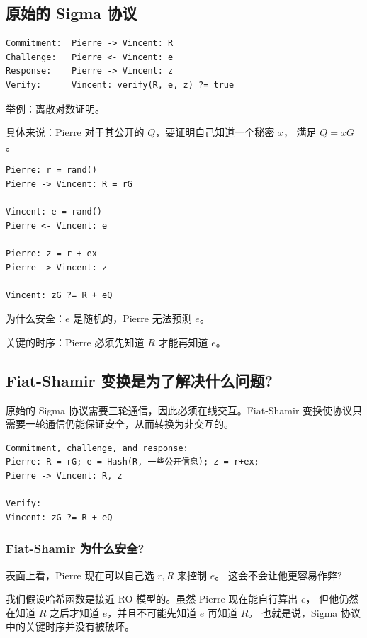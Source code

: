 

\subsection{原始的 Sigma 协议}

\begin{verbatim}
Commitment:  Pierre -> Vincent: R
Challenge:   Pierre <- Vincent: e
Response:    Pierre -> Vincent: z
Verify:      Vincent: verify(R, e, z) ?= true
\end{verbatim}

举例：离散对数证明。

具体来说：Pierre 对于其公开的 $Q$，要证明自己知道一个秘密 $x$，
满足 $Q=xG$。

\begin{verbatim}
Pierre: r = rand()
Pierre -> Vincent: R = rG

Vincent: e = rand()
Pierre <- Vincent: e

Pierre: z = r + ex
Pierre -> Vincent: z

Vincent: zG ?= R + eQ
\end{verbatim}

为什么安全：$e$ 是随机的，Pierre 无法预测 $e$。

关键的时序：Pierre 必须先知道 $R$ 才能再知道 $e$。

\subsection{Fiat-Shamir 变换是为了解决什么问题?}

原始的 Sigma 协议需要三轮通信，因此必须在线交互。Fiat-Shamir
变换使协议只需要一轮通信仍能保证安全，从而转换为非交互的。

\begin{verbatim}
Commitment, challenge, and response:
Pierre: R = rG; e = Hash(R, 一些公开信息); z = r+ex;
Pierre -> Vincent: R, z

Verify:
Vincent: zG ?= R + eQ
\end{verbatim}

\subsubsection{Fiat-Shamir 为什么安全?}

表面上看，Pierre 现在可以自己选 $r, R$ 来控制 $e$。
这会不会让他更容易作弊?

我们假设哈希函数是接近 RO 模型的。虽然 Pierre 现在能自行算出 $e$，
但他仍然在知道 $R$ 之后才知道 $e$，并且不可能先知道 $e$ 再知道 $R$。
也就是说，Sigma 协议中的关键时序并没有被破坏。

